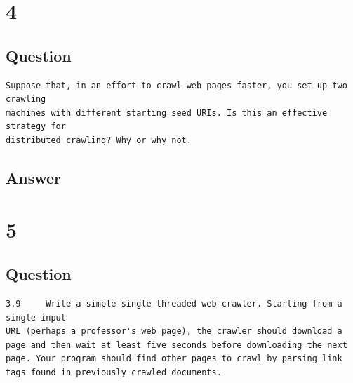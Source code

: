 \documentclass[letterpaper,11pt]{article}
\begin{document}
\clearpage


\section*{4}

\subsection*{Question}

\begin{verbatim}
Suppose that, in an effort to crawl web pages faster, you set up two crawling 
machines with different starting seed URIs. Is this an effective strategy for 
distributed crawling? Why or why not.
\end{verbatim}

\subsection*{Answer}




\clearpage


\section*{5}

\subsection*{Question}

\begin{verbatim}
3.9 	Write a simple single-threaded web crawler. Starting from a single input 
URL (perhaps a professor's web page), the crawler should download a 
page and then wait at least five seconds before downloading the next 
page. Your program should find other pages to crawl by parsing link 
tags found in previously crawled documents.
\end{verbatim}
\end{document}
